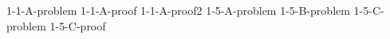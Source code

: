 \documentclass[uplatex, dvipdfmx, a4paper, 12pt, class=jsarticle, crop=false]{standalone}
\begin{document}
	{1-1-A-problem}
	{1-1-A-proof}
	{1-1-A-proof2}
	{1-5-A-problem}
	{1-5-B-problem}
	{1-5-C-problem}
	{1-5-C-proof}
\end{document}

